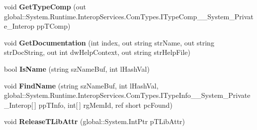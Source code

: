 \begin{DoxyCompactItemize}
\item 
\mbox{\label{interface_system_1_1_runtime_1_1_interop_services_1_1_com_types_1_1_i_type_lib_____system___private___interop_a1ec943ec9b2d14dd70c3367706164a45}} 
void {\bfseries Get\+Type\+Comp} (out global\+::\+System.\+Runtime.\+Interop\+Services.\+Com\+Types.\+I\+Type\+Comp\+\_\+\+\_\+\+System\+\_\+\+Private\+\_\+\+Interop pp\+T\+Comp)
\item 
\mbox{\label{interface_system_1_1_runtime_1_1_interop_services_1_1_com_types_1_1_i_type_lib_____system___private___interop_aff9e8eca4346610e25643d0f21d2bb4f}} 
void {\bfseries Get\+Documentation} (int index, out string str\+Name, out string str\+Doc\+String, out int dw\+Help\+Context, out string str\+Help\+File)
\item 
\mbox{\label{interface_system_1_1_runtime_1_1_interop_services_1_1_com_types_1_1_i_type_lib_____system___private___interop_a3dbf23af652bedf5fa2f224e41e467d9}} 
bool {\bfseries Is\+Name} (string sz\+Name\+Buf, int l\+Hash\+Val)
\item 
\mbox{\label{interface_system_1_1_runtime_1_1_interop_services_1_1_com_types_1_1_i_type_lib_____system___private___interop_a8b02e80b39806b510da13271024c7b50}} 
void {\bfseries Find\+Name} (string sz\+Name\+Buf, int l\+Hash\+Val, global\+::\+System.\+Runtime.\+Interop\+Services.\+Com\+Types.\+I\+Type\+Info\+\_\+\+\_\+\+System\+\_\+\+Private\+\_\+\+Interop\mbox{[}$\,$\mbox{]} pp\+T\+Info, int\mbox{[}$\,$\mbox{]} rg\+Mem\+Id, ref short pc\+Found)
\item 
\mbox{\label{interface_system_1_1_runtime_1_1_interop_services_1_1_com_types_1_1_i_type_lib_____system___private___interop_a35bcf4ef9e11f232d8be78df4d98603f}} 
void {\bfseries Release\+T\+Lib\+Attr} (global\+::\+System.\+Int\+Ptr p\+T\+Lib\+Attr)
\item 

\end{DoxyCompactItemize}
